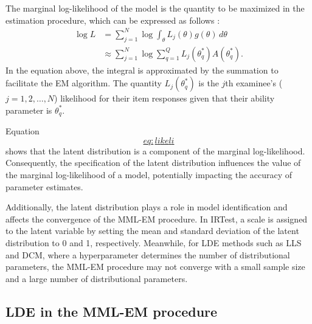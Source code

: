 The marginal log-likelihood of the model is the quantity to be maximized
in the estimation procedure, which can be expressed as follows
\citep{Baker+Kim:2004}: \[\begin{split}
\log L &= \sum_{j = 1}^{N}
{ \log{ \int_{\theta}{ L_j (\theta) g (\theta) \, d \theta } } } \\
&\approx \sum_{j = 1}^{N}
{ \log{ \sum_{q = 1}^{Q}{ L_j{\left( \theta^{*}_{q} \right)}
A{\left( \theta^{*}_{q} \right)} } } }.
\end{split}
\label{eq:likeli}\] In the equation above, the integral is approximated
by the summation to facilitate the EM algorithm. The quantity
\(L_j{\left( \theta^{*}_{q} \right)}\) is the \(j\)th examinee's
(\(j = 1, 2, \dots, N\)) likelihood for their item responses given that
their ability parameter is \(\theta^{*}_{q}\).

Equation \protect\hyperlink{eq:likeli}{\[eq:likeli\]} shows that the latent distribution is a component
of the marginal log-likelihood. Consequently, the specification of the
latent distribution influences the value of the marginal log-likelihood
of a model, potentially impacting the accuracy of parameter estimates.

Additionally, the latent distribution plays a role in model
identification and affects the convergence of the MML-EM procedure. In
IRTest, a scale is assigned to the latent variable by setting the mean
and standard deviation of the latent distribution to 0 and 1,
respectively. Meanwhile, for LDE methods such as LLS and DCM, where a
hyperparameter determines the number of distributional parameters, the
MML-EM procedure may not converge with a small sample size and a large
number of distributional parameters.

\hypertarget{lde-in-the-mml-em-procedure}{%
\subsection{LDE in the MML-EM procedure}\label{lde-in-the-mml-em-procedure}}

